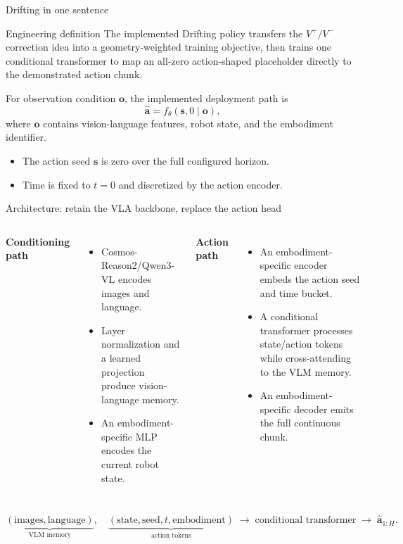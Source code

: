 \documentclass[aspectratio=169,10pt]{beamer}
\newcommand{\vect}[1]{\mathbf{#1}}
\begin{document}
\begin{frame}{Drifting in one sentence}
  \begin{block}{Engineering definition}
    The implemented Drifting policy transfers the $V^{+}/V^{-}$ correction idea
    into a geometry-weighted training objective, then trains one conditional
    transformer to map an all-zero action-shaped placeholder directly to the
    demonstrated action chunk.
  \end{block}

  \vspace{0.5em}
  For observation condition $\vect{o}$, the implemented deployment path is
  \[
    \hat{\vect{a}}
    =
    f_\theta(\vect{s}, 0 \mid \vect{o}),
  \]
  where $\vect{o}$ contains vision-language features, robot state, and the
  embodiment identifier.

  \begin{itemize}
    \item The action seed $\vect{s}$ is zero over the full configured horizon.
    \item Time is fixed to $t=0$ and discretized by the action encoder.
  \end{itemize}
\end{frame}

\begin{frame}{Architecture: retain the VLA backbone, replace the action head}
  \small
  \begin{columns}[T]
      \textbf{Conditioning path}
      \begin{itemize}
        \item Cosmos-Reason2/Qwen3-VL encodes images and language.
        \item Layer normalization and a learned projection produce
              vision-language memory.
        \item An embodiment-specific MLP encodes the current robot state.
      \end{itemize}
      \textbf{Action path}
      \begin{itemize}
        \item An embodiment-specific encoder embeds the action seed and time bucket.
        \item A conditional transformer processes state/action tokens while
              cross-attending to the VLM memory.
        \item An embodiment-specific decoder emits the full continuous chunk.
      \end{itemize}
  \end{columns}

  \vspace{0.7em}
  \[
    \underbrace{(\text{images},\text{language})}_{\text{VLM memory}},
    \quad
    \underbrace{(\text{state},\text{seed},t,\text{embodiment})}_{\text{action tokens}}
    \;\longrightarrow\;
    \text{conditional transformer}
    \;\longrightarrow\;
    \hat{\vect{a}}_{1:H}.
  \]
\end{frame}
\end{document}
